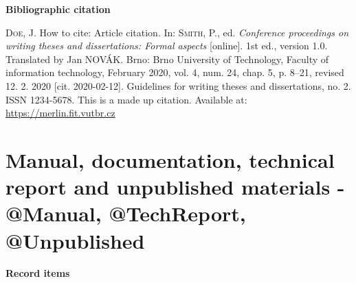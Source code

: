 \bigskip

\noindent \textbf{Bibliographic citation}

\medskip

\noindent \textsc{Doe}, J. How to cite: Article citation.
In: \textsc{Smith}, P., ed. \textit{Conference proceedings on writing theses and dissertations: Formal aspects} [online]. 1st ed., version 1.0. Translated by Jan NOVÁK. Brno: Brno University of Technology, Faculty of information technology, February 2020, vol. 4, num. 24, chap. 5, p. 8–21, revised 12. 2. 2020 [cit. 2020-02-12]. Guidelines for writing theses and dissertations, no. 2. ISSN 1234-5678. This is a made up citation. Available at: \url{https://merlin.fit.vutbr.cz}
\newpage
\section*{Manual, documentation, technical report and unpublished materials - @Manual, @TechReport, @Unpublished}
\label{pr-manual}
\noindent \textbf{Record items}

\medskip

